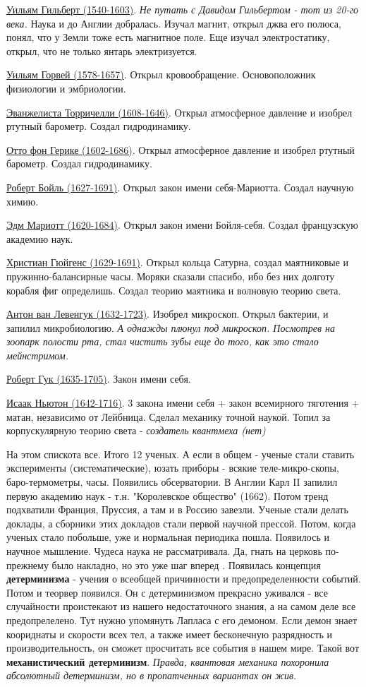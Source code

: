 \underline{Уильям Гильберт (1540-1603)}. \textit{Не путать с Давидом Гильбертом - тот из 20-го века.} Наука и до Англии добралась. Изучал магнит, открыл джва его полюса, понял, что у Земли тоже есть магнитное поле. Еще изучал электростатику, открыл, что не только янтарь электризуется.

\underline{Уильям Горвей (1578-1657)}. Открыл кровообращение. Основоположник физиологии и эмбриологии.

\underline{Эванжелиста Торричелли (1608-1646)}. Открыл атмосферное давление и изобрел ртутный барометр. Создал гидродинамику.

\underline{Отто фон Герике (1602-1686)}. Открыл атмосферное давление и изобрел ртутный барометр. Создал гидродинамику.

\underline{Роберт Бойль (1627-1691)}. Открыл закон имени себя-Мариотта. Создал научную химию.

\underline{Эдм Мариотт (1620-1684)}. Открыл закон имени Бойля-себя. Создал французскую академию наук.

\underline{Христиан Гюйгенс (1629-1691)}. Открыл кольца Сатурна, создал маятниковые и пружинно-балансирные часы. Моряки сказали спасибо, ибо без них долготу корабля фиг определишь. Создал теорию маятника и волновую теорию света.

\underline{Антон ван Левенгук (1632-1723)}. Изобрел микроскоп. Открыл бактерии, и запилил микробиологию. \textit{А однажды плюнул под микроскоп. Посмотрев на зоопарк полости рта, стал чистить зубы еще до того, как это стало мейнстримом.}

\underline{Роберт Гук (1635-1705)}. Закон имени себя.

\underline{Исаак Ньютон (1642-1716)}. 3 закона имени себя + закон всемирного тяготения + матан, независимо от Лейбница. Сделал механику точной наукой. Топил за корпускулярную теорию света - \textit{создатель квантмеха (нет)}
 
На этом спискота все. Итого 12 ученых. А если в общем - ученые стали ставить эксперименты (систематические), юзать приборы - всякие теле-микро-скопы, баро-термометры, часы. Появились обсерватории. В Англии Карл II запилил первую академию наук - т.н. "Королевское общество" (1662). Потом тренд подхватили Франция, Пруссия, а там и в Россию завезли. Ученые стали делать доклады, а сборники этих докладов стали первой научной прессой. Потом, когда ученых стало побольше, уже и нормальная периодика пошла. Появилось и научное мышление. Чудеса наука не рассматривала. Да, гнать на церковь по-прежнему было накладно, но это уже шаг вперед . Появилась концепция \textbf{детерминизма} - учения о всеобщей причинности и предопределенности событий. Потом и теорвер появился. Он с детерминизмом прекрасно уживался - все случайности проистекают из нашего недостаточного знания, а на самом деле все предопрелелено. Тут нужно упомянуть Лапласа с его демоном. Если демон знает коориднаты и скорости всех тел, а также имеет бесконечную разрядность и производительность, он сможет просчитать все события в нашем мире. Такой вот \textbf{механистический детерминизм}. \textit{Правда, квантовая механика похоронила абсолютный детерминизм, но в пропатченных вариантах он жив}.

